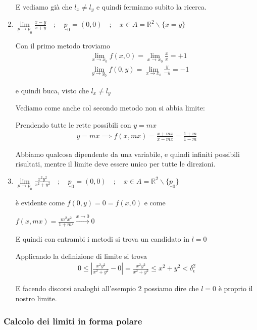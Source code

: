 \begin{enumerate}
	E vediamo già che $l_x\neq l_y$ e quindi fermiamo subito la ricerca.
	
	\item $\underset{\underline{p}\rightarrow \underline{p}_0}{\lim} \frac{x-y}{x + y} \quad ; \quad \underline{p}_0=(0,0) \quad ; \quad  x\in A=\mathbb{R}^2\backslash \{x=y\}$
	
	\bigskip
	
	Con il primo metodo troviamo
	\begin{align}
	&\underset{x\rightarrow x_0}{\lim}f(x,0)= \underset{x\rightarrow x_0}{\lim} \frac{x}{x}= +1\\
	&\underset{y\rightarrow y_0}{\lim}f(0,y)= \underset{x\rightarrow x_0}{\lim} \frac{y}{-y}= -1
	\end{align}
	
	e quindi buca, visto che $l_x\neq l_y$
	
	Vediamo come anche col secondo metodo non si abbia limite:
	
	Prendendo tutte le rette possibili con $y=mx$
	\begin{align}
	y=mx \implies f(x,mx)=\frac{x + mx}{x - mx}= \frac{1+m}{1-m}
	\end{align}
	
	Abbiamo qualcosa dipendente da una variabile, e quindi infiniti possibili risultati, mentre il limite deve essere unico per tutte le direzioni.
	
	\item $\underset{\underline{p}\rightarrow \underline{p}_0}{\lim}\frac{x^2 y^2}{x^2 + y^2}  \quad ; \quad \underline{p}_0=(0,0) \quad ; \quad  x\in A=\mathbb{R}^2\backslash \{\underline{p}_0\}$
	
	\bigskip
		
	è evidente come $f(0,y)=0=f(x,0)$ e come
	
	 $f(x,mx)=\frac{m^2 x^2}{1+m^2}\overset{x\rightarrow 0}{\longrightarrow} 0$
	
	E quindi con entrambi i metodi si trova un candidato in $l=0$
	
	Applicando la definizione di limite si trova
	\begin{align}
	0\leq \left|\frac{x^2 y^2}{x^2 + y^2} - 0\right|= \frac{x^2 y^2}{x^2 + y^2}\leq x^2 + y^2 < \delta^2_\epsilon
	\end{align}
	
	E facendo discorsi analoghi all'esempio 2 possiamo dire che $l=0$ è proprio il nostro limite.
\end{enumerate}

\subsubsection{Calcolo dei limiti in forma polare} 

